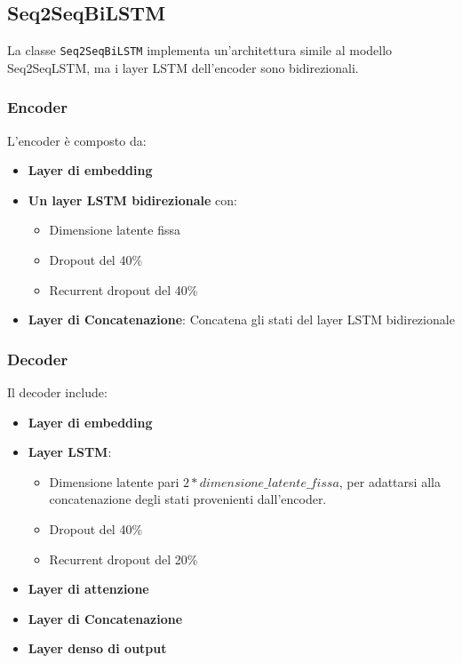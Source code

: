 
\subsection{Seq2SeqBiLSTM}
La classe \texttt{Seq2SeqBiLSTM} implementa un'architettura simile al modello Seq2SeqLSTM, ma i layer LSTM dell'encoder sono bidirezionali.\\

\subsubsection{Encoder}
L'encoder è composto da:
\begin{itemize}
    \item \textbf{Layer di embedding}
    \item \textbf{Un layer LSTM bidirezionale} con:
        \begin{itemize}
            \item Dimensione latente fissa
            \item Dropout del 40\%
            \item Recurrent dropout del 40\%
        \end{itemize}
    \item \textbf{Layer di Concatenazione}: Concatena gli stati del layer LSTM bidirezionale
\end{itemize}

\subsubsection{Decoder}
Il decoder include:
\begin{itemize}
    \item \textbf{Layer di embedding}
    \item \textbf{Layer LSTM}:
        \begin{itemize}
            \item Dimensione latente pari \(2 * \textit{dimensione\_latente\_fissa}\), per adattarsi alla concatenazione degli stati provenienti dall'encoder.
            \item Dropout del 40\%
            \item Recurrent dropout del 20\%
        \end{itemize}
    \item \textbf{Layer di attenzione}
    \item \textbf{Layer di Concatenazione}
    \item \textbf{Layer denso di output}
\end{itemize}

